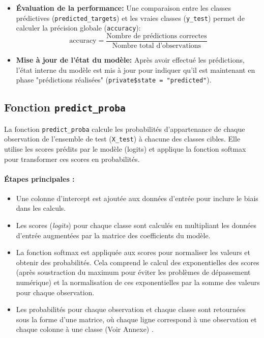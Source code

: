 \documentclass{rapport}
\begin{document}
\begin{itemize}
    \item \textbf{Évaluation de la performance:}
    Une comparaison entre les classes prédictives (\texttt{predicted\_targets}) et les vraies classes (\texttt{y\_test}) permet de calculer la précision globale (\texttt{accuracy}):
    \[
    \text{accuracy} = \frac{\text{Nombre de prédictions correctes}}{\text{Nombre total d'observations}}
    \]

    \item \textbf{Mise à jour de l'état du modèle:}
    Après avoir effectué les prédictions, l’état interne du modèle est mis à jour pour indiquer qu’il est maintenant en phase "prédictions réalisées" (\texttt{private\$state = "predicted"}).
\end{itemize}


\subsection{Fonction \texttt{predict\_proba}} 
La fonction \texttt{predict\_proba} calcule les probabilités d'appartenance de chaque observation de l'ensemble de test (\texttt{X\_test}) à chacune des classes cibles. Elle utilise les scores prédits par le modèle (logits) et applique la fonction softmax pour transformer ces scores en probabilités.

\paragraph{Étapes principales :}
\begin{itemize}
    \item Une colonne d'intercept est ajoutée aux données d'entrée pour inclure le biais dans les calculs.
    \item Les scores (\textit{logits}) pour chaque classe sont calculés en multipliant les données d'entrée augmentées par la matrice des coefficients du modèle.
    
    \item La fonction softmax est appliquée aux scores pour normaliser les valeurs et obtenir des probabilités. Cela comprend le calcul des exponentielles des scores (après soustraction du maximum pour éviter les problèmes de dépassement numérique) et la normalisation de ces exponentielles par la somme des valeurs pour chaque observation.
    
    \item Les probabilités pour chaque observation et chaque classe sont retournées sous la forme d'une matrice, où chaque ligne correspond à une observation et chaque colonne à une classe (Voir Annexe) .
\end{itemize}
\end{document}
